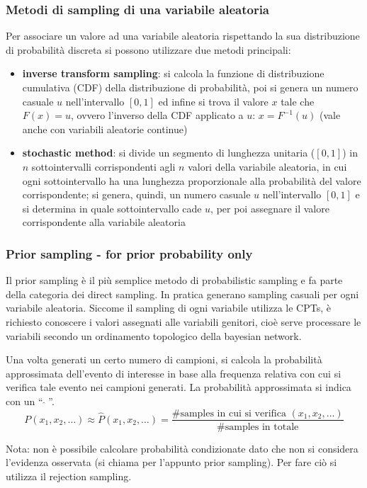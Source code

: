 \subsubsection*{Metodi di sampling di una variabile aleatoria}
Per associare un valore ad una variabile aleatoria rispettando la sua distribuzione di probabilità discreta si possono
utilizzare due metodi principali:
\begin{itemize}
	\item \textbf{inverse transform sampling}: si calcola la funzione di distribuzione cumulativa (CDF) della distribuzione
	di probabilità, poi si genera un numero casuale \(u\) nell'intervallo \([0, 1]\) ed infine si trova il valore \(x\) tale
	che \(F(x) = u\), ovvero l'inverso della CDF applicato a \(u\): \(x = F^{-1}(u)\) (vale anche con variabili
	aleatorie continue)
	\item \textbf{stochastic method}: si divide un segmento di lunghezza unitaria (\([0, 1]\)) in \(n\) sottointervalli
	corrispondenti agli \(n\) valori della variabile aleatoria, in cui ogni sottointervallo ha una lunghezza proporzionale
	alla probabilità del valore corrispondente; si genera, quindi, un numero casuale \(u\) nell'intervallo \([0, 1]\) e
	si determina in quale sottointervallo cade \(u\), per poi assegnare il valore corrispondente alla variabile aleatoria
\end{itemize}

\subsubsection*{Prior sampling - for prior probability only}
Il prior sampling è il più semplice metodo di probabilistic sampling e fa parte della categoria dei direct sampling. In
pratica generano sampling casuali per ogni variabile aleatoria. Siccome il sampling di ogni variabile utilizza le CPTs,
è richiesto conoscere i valori assegnati alle variabili genitori, cioè serve processare le variabili secondo un ordinamento
topologico della bayesian network.

Una volta generati un certo numero di campioni, si calcola la probabilità approssimata dell'evento di interesse in base
alla frequenza relativa con cui si verifica tale evento nei campioni generati. La probabilità approssimata si indica
con un ``\(\; \hat{} \;\)''.
\[P(x_1, x_2, \dots) \approx \hat{P}(x_1, x_2, \dots) = \frac{\text{\# samples in cui si verifica } (x_1, x_2, \dots)}{\text{\# samples in totale}}\]

Nota: non è possibile calcolare probabilità condizionate dato che non si considera l'evidenza osservata (si chiama per l'appunto
prior sampling). Per fare ciò si utilizza il rejection sampling.

